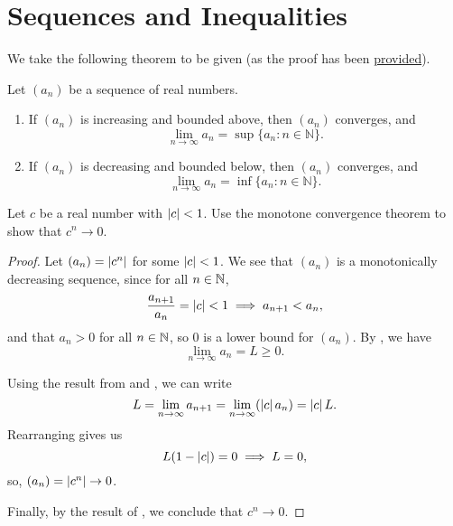 \section{Sequences and Inequalities}

\begin{callout}
  We take the following theorem to be given (as the proof has been \href{https://youtu.be/qmvUCX6vU-E?si=jZBNzDi757yGhokl&t=516}{provided}).
  \begin{theorem}
  \label{thm:monotone-convergence}
  Let $(a_n)$ be a sequence of real numbers.
    \begin{enumerate}[label=(\alph*)]
      \item If $(a_n)$ is increasing and bounded above, then $(a_n)$ converges, and
      \[
        \lim_{n \to \infty} a_n = \sup \{ a_n : n \in \mathbb{N} \}.
      \]
      
      \item If $(a_n)$ is decreasing and bounded below, then $(a_n)$ converges, and
      \[
        \lim_{n \to \infty} a_n = \inf \{ a_n : n \in \mathbb{N} \}.
      \]
    \end{enumerate}
  \end{theorem}
\end{callout}

\begin{problem}
  Let $c$ be a real number with $\left\lvert c \right\rvert < 1$. Use the monotone convergence theorem to show that $c^{n} \to 0$. 

  \begin{proof}
    Let $(a_{n}) = \left\lvert c^{n} \right\rvert$ for some $\left\lvert c \right\rvert < 1$. We see that $(a_{n})$ is a monotonically decreasing 
    sequence, since for all $n \in \mathbb{N}$,
    \[
      \frac{a_{n+1}}{a_{n}} = \left\lvert c \right\rvert < 1 \implies a_{n+1} < a_{n},
    \]
    and that $a_{n} > 0$ for all $n \in \mathbb{N}$, so $0$ is a lower bound for $(a_{n})$. By , we have 
    \[
      \lim_{n \to \infty} a_{n} = L \geq 0.
    \]

    Using the result from  and , we can write
    \[
      L = \lim_{n \to \infty} a_{n+1} = \lim_{n \to \infty} (\left\lvert c \right\rvert a_{n}) = \left\lvert c \right\rvert L.
    \]
    Rearranging gives us
    \[
      L(1 - \left\lvert c \right\rvert) = 0 \implies L = 0,
    \]
    so, $(a_{n}) = \left\lvert c^{n} \right\rvert \to 0$. 

    Finally, by the result of , we conclude that $c^{n} \to 0$.
  \end{proof}
\end{problem}

